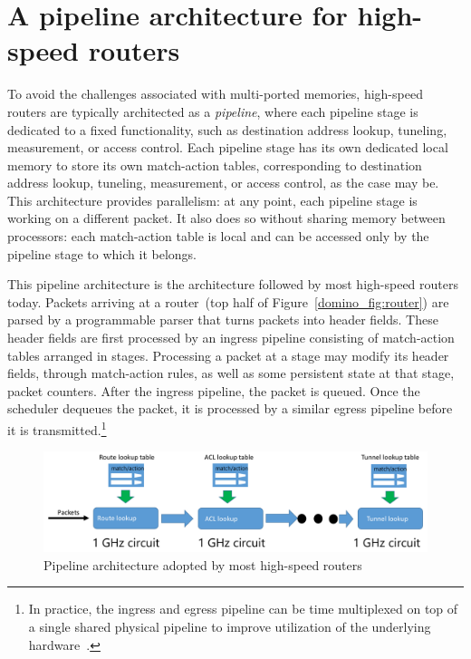 \section{A pipeline architecture for high-speed routers}
To avoid the challenges associated with multi-ported memories, high-speed
routers are typically architected as a {\em pipeline}, where each pipeline
stage is dedicated to a fixed functionality, such as destination address
lookup, tuneling, measurement, or access control. Each pipeline stage has its
own dedicated local memory to store its own match-action tables, corresponding
to destination address lookup, tuneling, measurement, or access control, as the
case may be. This architecture provides parallelism: at any point, each
pipeline stage is working on a different packet. It also does so without
sharing memory between processors: each match-action table is local and can be
accessed only by the pipeline stage to which it belongs.

This pipeline architecture is the architecture followed by most high-speed
routers today. Packets arriving at a router~(top half of
Figure~\ref{domino_fig:router}) are parsed by a programmable parser that turns
packets into header fields. These header fields are first processed by an
ingress pipeline consisting of match-action tables arranged in stages.
Processing a packet at a stage may modify its header fields, through
match-action rules, as well as some persistent state at that stage, \eg packet
counters. After the ingress pipeline, the packet is queued. Once the scheduler
dequeues the packet, it is processed by a similar egress pipeline before it is
transmitted.\footnote{In practice, the ingress and egress pipeline can be time
multiplexed on top of a single shared physical pipeline to improve utilization
of the underlying hardware~\cite{rmt}.}

\begin{figure}[!t]
\includegraphics[width=\textwidth]{pipeline.pdf}
\caption{Pipeline architecture adopted by most high-speed routers}
\label{fig:pipeline}
\end{figure}

